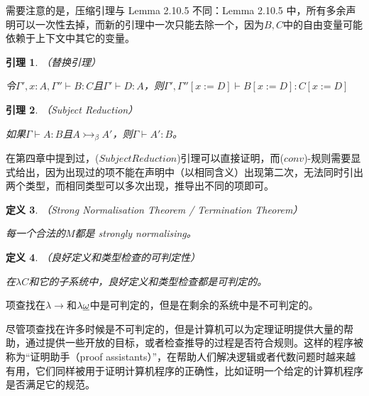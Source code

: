 \documentclass[UTF8]{article}
\newtheorem{thm}{定义}[section]
\newtheorem{lemma}[thm]{引理}
\begin{document}
		需要注意的是，压缩引理与 Lemma 2.10.5 不同：Lemma 2.10.5 中，所有多余声明可以一次性去掉，而新的引理中一次只能去除一个，因为$B,C$中的自由变量可能依赖于上下文中其它的变量。
		
		\begin{lemma}（替换引理）
			
			令$\Gamma',x:A,\Gamma''\vdash B:C$且$\Gamma'\vdash D:A$，则$\Gamma',\Gamma''\left[ x:=D\right]\vdash B
			\left[x:=D\right]:C\left[x:=D\right]$
		\end{lemma}
	
		\begin{lemma}（Subject Reduction）
			
			如果$\Gamma\vdash A:B$且$A\rightarrowtail_\beta A'$，则$\Gamma\vdash A':B$。
		\end{lemma}
	
		在第四章中提到过，($Subject Reduction$)引理可以直接证明，而($conv$)-规则需要显式给出，因为出现过的项不能在声明中（以相同含义）出现第二次，无法同时引出两个类型，而相同类型可以多次出现，推导出不同的项即可。
		
		\begin{thm}（Strong Normalisation Theorem / Termination Theorem）
			
			每一个合法的$M$都是 strongly normalising。
		\end{thm}
	
		\begin{thm}（良好定义和类型检查的可判定性）
			
			在$\lambda{C}$和它的子系统中，良好定义和类型检查都是可判定的。
		\end{thm}
	
		项查找在$\lambda{\rightarrow}$和$\lambda{\uline{\omega}}$中是可判定的，但是在剩余的系统中是不可判定的。
		
		尽管项查找在许多时候是不可判定的，但是计算机可以为定理证明提供大量的帮助，通过提供一些开放的目标，或者检查推导的过程是否符合规则。这样的程序被称为“证明助手（proof assistants）”，在帮助人们解决逻辑或者代数问题时越来越有用，它们同样被用于证明计算机程序的正确性，比如证明一个给定的计算机程序是否满足它的规范。
\end{document}
